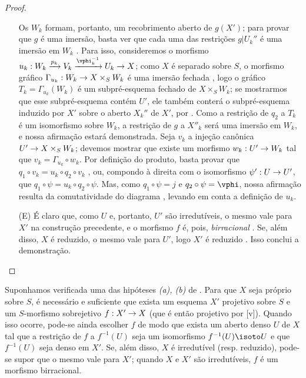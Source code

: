 \documentclass[oneside,10pt]{amsart}
\makeatletter
\newcommand{\ega@arrow}[2]{\mathchoice{#1}{#2}{#2}{#2}}
\renewcommand{\to}{\ega@arrow{\longrightarrow}{\rightarrow}}
\newcommand{\oldpage}[2][]{\marginnote{\normalfont\footnotesize\textbf{#1}~|~#2}\ignorespaces}
\let\EGAOriginalLabel\label
\renewcommand{\label}[1]{\phantomsection\EGAOriginalLabel{#1}}
\makeatother
\begin{document}
\begin{proof}
\begin{enumerate}
    Os $W_k$ formam, portanto, um recobrimento aberto de $g(X')$; para provar que $g$ é uma imersão, basta ver que cada uma das restrições $g|U_k''$ é uma imersão em $W_k$ .
    Para isso, consideremos o morfismo $u_k:W_k\xrightarrow{p_k}V_k\xrightarrow{\vphi_k^{-1}}U_k\to X$; como $X$ é separado sobre $S$, o morfismo gráfico $\Gamma_{u_k}:W_k\to X\times_S W_k$ é uma imersão fechada , logo o gráfico $T_k=\Gamma_{u_k}(W_k)$ é um subpré-esquema fechado de $X\times_S W_k$;
    se mostrarmos que esse subpré-esquema contém $U'$, ele também conterá o subpré-esquema induzido por $X'$ sobre o aberto $X_k''$ de $X'$, por .
    Como a restrição de $q_2$ a $T_k$ é um isomorfismo sobre $W_k$, a restrição de $g$ a $X''_k$ será uma imersão em $W_k$, e nossa afirmação estará demonstrada.
    Seja $v_k$ a injeção canônica $U'\to X\times_S W_k$; devemos mostrar que existe um morfismo $w_k:U'\to W_k$ tal que $v_k=\Gamma_{u_k}\circ w_k$.
    Por definição do produto, basta provar que $q_1\circ v_k=u_k\circ q_2\circ v_k$ , ou, compondo à direita
\oldpage[II]{109}
com o isomorfismo $\psi':U\to U'$, que $q_1\circ\psi=u_k\circ q_2\circ\psi$.
Mas, como $q_1\circ\psi=j$ e $q_2\circ\psi=\vphi$, nossa afirmação resulta da comutatividade do diagrama , levando em conta a definição de $u_k$.
  \item[(E)] É claro que, como $U$ e, portanto, $U'$ são irredutíveis, o mesmo vale para $X'$ na construção precedente, e o morfismo $f$ é, pois, \emph{birracional} .
    Se, além disso, $X$ é reduzido, o mesmo vale para $U'$, logo $X'$ é reduzido .
    Isso conclui a demonstração.
\end{enumerate}
\end{proof}

\begin{corollary}[5.6.2]
\label{II.5.6.2}
Suponhamos verificada uma das hipóteses \emph{(a), (b)} de .
Para que $X$ seja próprio sobre $S$, é necessário e suficiente que exista um esquema $X'$ projetivo sobre $S$ e um $S$-morfismo sobrejetivo $f:X'\to X$ (que é então projetivo por [v]).
Quando isso ocorre, pode-se ainda escolher $f$ de modo que exista um aberto denso $U$ de $X$ tal que a restrição de $f$ a $f^{-1}(U)$ seja um isomorfismo $f^{-1}(U)\isoto U$ e que $f^{-1}(U)$ seja denso em $X'$.
Se, além disso, $X$ é irredutível (resp. reduzido), pode-se supor que o mesmo vale para $X'$; quando $X$ e $X'$ são irredutíveis, $f$ é um morfismo birracional.
\end{corollary}
\end{document}
